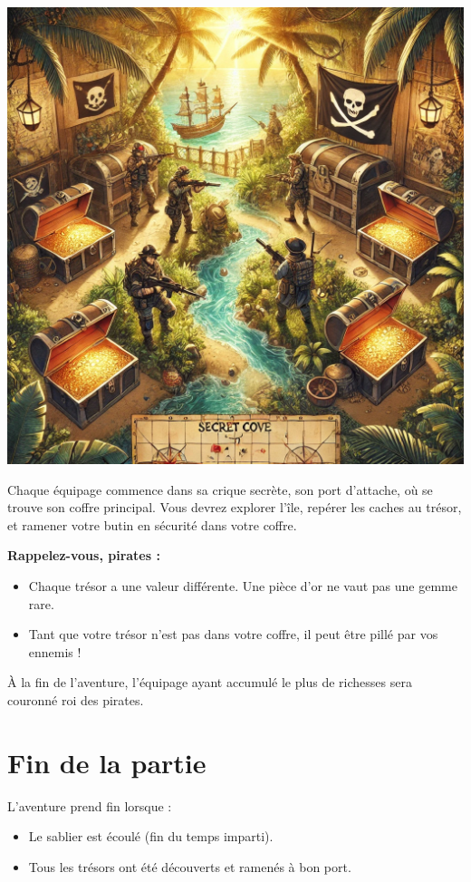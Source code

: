 \documentclass{pirategame}
\begin{document}
\begin{minipage}[t]{0.28\textwidth}
  \vspace{0em}
  \includegraphics[width=\linewidth]{img/start.png}
\end{minipage}
\hfill
\begin{minipage}[t]{0.7\textwidth}
  Chaque équipage commence dans sa crique secrète, son port d'attache, où se trouve son coffre principal. Vous devrez explorer l'île, repérer les caches au trésor, et ramener votre butin en sécurité dans votre coffre.

  \textbf{Rappelez-vous, pirates :}
  \begin{itemize}
      \item Chaque trésor a une valeur différente. Une pièce d'or ne vaut pas une gemme rare.
      \item Tant que votre trésor n'est pas dans votre coffre, il peut être pillé par vos ennemis !
  \end{itemize}
  
  À la fin de l'aventure, l'équipage ayant accumulé le plus de richesses sera couronné roi des pirates.
\end{minipage}



\section{Fin de la partie}
L'aventure prend fin lorsque :
\begin{itemize}
    \item Le sablier est écoulé (fin du temps imparti).
    \item Tous les trésors ont été découverts et ramenés à bon port.
\end{itemize}
\end{document}

